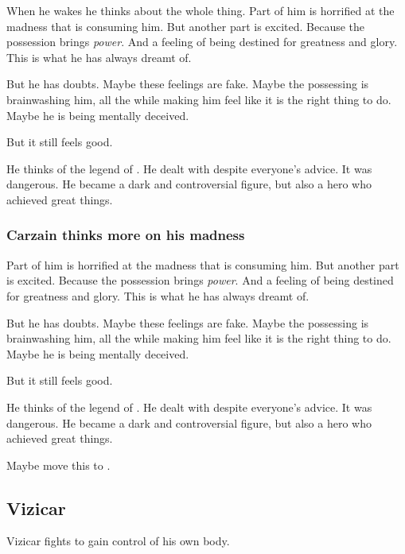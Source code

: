 When he wakes he thinks about the whole thing. 
Part of him is horrified at the madness that is consuming him. 
But another part is excited. 
Because the possession brings \emph{power}. 
And a feeling of being destined for greatness and glory. 
This is what he has always dreamt of. 

But he has doubts. 
Maybe these feelings are fake. 
Maybe the possessing \Archon{} is brainwashing him, all the while making him feel like it is the right thing to do. 
Maybe he is being mentally deceived. 

But it still feels good. 

He thinks of the legend of . 
He dealt with \qliphoth{} despite everyone's advice. 
It was dangerous. 
He became a dark and controversial figure, but also a hero who achieved great things. 





\subsubsection{Carzain thinks more on his madness}
Part of him is horrified at the madness that is consuming him. 
But another part is excited. 
Because the possession brings \emph{power}. 
And a feeling of being destined for greatness and glory. 
This is what he has always dreamt of. 

But he has doubts. 
Maybe these feelings are fake. 
Maybe the possessing \Archon{} is brainwashing him, all the while making him feel like it is the right thing to do. 
Maybe he is being mentally deceived. 

But it still feels good. 

He thinks of the legend of . 
He dealt with \qliphoth{} despite everyone's advice. 
It was dangerous. 
He became a dark and controversial figure, but also a hero who achieved great things. 

Maybe move this to . 





\subsection{Vizicar}
Vizicar fights to gain control of his own body. 

